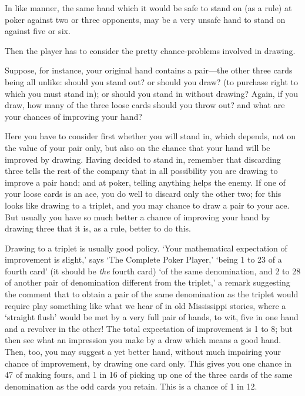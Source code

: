 \documentclass[letterpaper,12pt,oneside,openany]{memoir}
\begin{document}
In like manner, the same hand which it would be
safe to stand on (as a rule) at poker against two or
three opponents, may be a very unsafe hand to stand
on against five or six.

Then the player has to consider the pretty chance-problems
involved in drawing.

Suppose, for instance, your original hand contains
a pair---the other three cards being all unlike: should
you stand out? or should you draw? (to purchase
right to which you must stand in); or should you
stand in without drawing? Again, if you draw,
how many of the three loose cards should you throw
out? and what are your chances of improving your
hand?

Here you have to consider first whether you will
stand in, which depends, not on the value of your pair
only, but also on the chance that your hand will be
improved by drawing. Having decided to stand in,
remember that discarding three tells the rest of the
company that in all possibility you are drawing to improve
a pair hand; and at poker, telling anything helps
the enemy. If one of your loose cards is an ace, you
do well to discard only the other two; for this looks
like drawing to a triplet, and you may chance to draw a
pair to your ace. But usually you have so much better
a chance of improving your hand by drawing three that
it is, as a rule, better to do this.

Drawing to a triplet is usually good policy. `Your
mathematical expectation of improvement is slight,'
says `The Complete Poker Player,' `being 1 to 23 of
a fourth card' (it should be \emph{the} fourth card) `of the
same denomination, and 2 to 28 of another pair of
denomination different from the triplet,' a remark suggesting
the comment that to obtain a pair of the same
denomination as the triplet would require play something
like what we hear of in old Mississippi stories,
where a `straight flush' would be met by a very full
pair of hands, to wit, five in one hand and a revolver in
the other! The total expectation of improvement is 1
to 8; but then see what an impression you make by a
draw which means a good hand. Then, too, you may
suggest a yet better hand, without much impairing your
chance of improvement, by drawing one card only.
This gives you one chance in 47 of making fours, and
1 in 16 of picking up one of the three cards of the same
denomination as the odd cards you retain. This is a
chance of 1 in 12.
\end{document}
